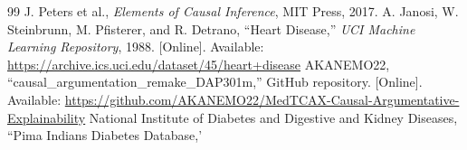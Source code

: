 \documentclass[conference, a4paper]{IEEEtran}
\begin{document}
\begin{thebibliography}{99}
 J. Peters et al., \textit{Elements of Causal Inference}, MIT Press, 2017.
A. Janosi, W. Steinbrunn, M. Pfisterer, and R. Detrano, ``Heart Disease,'' \textit{UCI Machine Learning Repository}, 1988. [Online]. Available: \url{https://archive.ics.uci.edu/dataset/45/heart+disease}
 AKANEMO22, ``causal\_argumentation\_remake\_DAP301m,'' GitHub repository. [Online]. Available: \url{https://github.com/AKANEMO22/MedTCAX-Causal-Argumentative-Explainability}
National Institute of Diabetes and Digestive and Kidney Diseases, ``Pima Indians Diabetes Database,'
\end{thebibliography}
\end{document}
